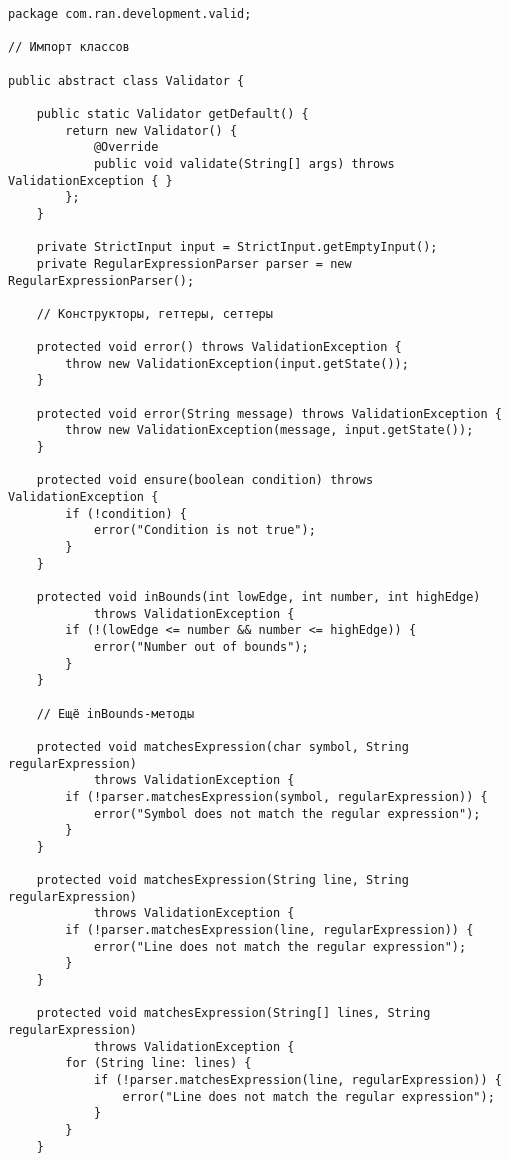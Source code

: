 \begin{verbatim}
package com.ran.development.valid;

// Импорт классов

public abstract class Validator {

    public static Validator getDefault() {
        return new Validator() {
            @Override
            public void validate(String[] args) throws ValidationException { }
        };
    }
    
    private StrictInput input = StrictInput.getEmptyInput();
    private RegularExpressionParser parser = new RegularExpressionParser();

    // Конструкторы, геттеры, сеттеры
    
    protected void error() throws ValidationException {
        throw new ValidationException(input.getState());
    }
    
    protected void error(String message) throws ValidationException {
        throw new ValidationException(message, input.getState());
    }
    
    protected void ensure(boolean condition) throws ValidationException {
        if (!condition) {
            error("Condition is not true");
        }
    }
    
    protected void inBounds(int lowEdge, int number, int highEdge)
            throws ValidationException {
        if (!(lowEdge <= number && number <= highEdge)) {
            error("Number out of bounds");
        }
    }
    
    // Ещё inBounds-методы
    
    protected void matchesExpression(char symbol, String regularExpression)
            throws ValidationException {
        if (!parser.matchesExpression(symbol, regularExpression)) {
            error("Symbol does not match the regular expression");
        }
    }
    
    protected void matchesExpression(String line, String regularExpression)
            throws ValidationException {
        if (!parser.matchesExpression(line, regularExpression)) {
            error("Line does not match the regular expression");
        }
    }
    
    protected void matchesExpression(String[] lines, String regularExpression)
            throws ValidationException {
        for (String line: lines) {
            if (!parser.matchesExpression(line, regularExpression)) {
                error("Line does not match the regular expression");
            }
        }
    }
    

\end{verbatim}
